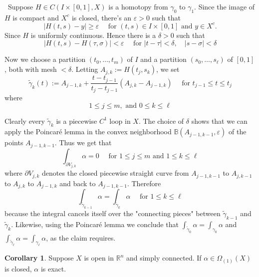 \documentclass[12pt,a4paper]{book}
\newenvironment{prooff}{{\noindent\it\textcolor{cyan!40!black}{Proof}:}\,}{\par}
\theoremstyle{definition}
\newtheorem{coro}[defn]{Corollary}
\begin{document}
\begin{prooff}
    Suppose $H \in C(I \times[0,1], X)$ is a homotopy from $\gamma_0$ to $\gamma_1$. Since the image of $H$
    is compact and $X^c$ is closed, there's an $\varepsilon>0$ such that
    $$
    |H(t, s)-y| \geq \varepsilon \quad \text { for }(t, s) \in I \times[0,1] \text { and } y \in X^c .
    $$
    Since $H$ is uniformly continuous. Hence there is a $\delta>0$ such that
    $$
    |H(t, s)-H(\tau, \sigma)|<\varepsilon \quad \text { for }|t-\tau|<\delta, \quad|s-\sigma|<\delta
    $$
    
    Now we choose a partition $\left(t_0, \ldots, t_m\right)$ of $I$ and a partition $\left(s_0, \ldots, s_{\ell}\right)$ of $[0,1]$, both with mesh $<\delta$. Letting $A_{j, k}:=H\left(t_j, s_k\right)$, we set
    $$
    \widetilde{\gamma}_k(t):=A_{j-1, k}+\frac{t-t_{j-1}}{t_j-t_{j-1}}\left(A_{j, k}-A_{j-1, k}\right) \quad \text { for } t_{j-1} \leq t \leq t_j
    $$
    where 
    $$
    1 \leq j \leq m, \text { and } 0 \leq k \leq \ell
    $$

Clearly every $\widetilde{\gamma}_k$ is a piecewise $C^1$ loop in $X$. The choice of $\delta$ shows that we can apply the Poincaré lemma in the convex neighborhood $\mathbb{B}\left(A_{j-1, k-1}, \varepsilon\right)$ of the points $A_{j-1, k-1}$. Thus we get that
$$
\int_{\partial V_{j, k}} \alpha=0 \quad \text { for } 1 \leq j \leq m \text { and } 1 \leq k \leq \ell
$$
where $\partial V_{j, k}$ denotes the closed piecewise straight curve from $A_{j-1, k-1}$ to $A_{j, k-1}$ to $A_{j, k}$ to $A_{j-1, k}$ and back to $A_{j-1, k-1}$. Therefore
$$
\int_{\widetilde{\gamma}_{k-1}} \alpha=\int_{\widetilde{\gamma}_k} \alpha \quad \text { for } 1 \leq k \leq \ell
$$
because the integral cancels itself over the "connecting pieces" between $\widetilde{\gamma}_{k-1}$ and $\widetilde{\gamma}_k$. Likewise, using the Poincaré lemma we conclude that $\int_{\tilde{\gamma}_0} \alpha=\int_{\gamma_0} \alpha$ and $\int_{\tilde{\gamma}_{\ell}} \alpha=\int_{\gamma_{\ell}} \alpha$, as the claim requires.
\end{prooff}
\begin{coro}
    Suppose $X$ is open in $\mathbb{R}^n$ and simply connected. If $\alpha \in \Omega_{(1)}(X)$ is closed, $\alpha$ is exact.
    \label{corollary: simply connected, closed implies exact}
\end{coro} 
\end{document}
